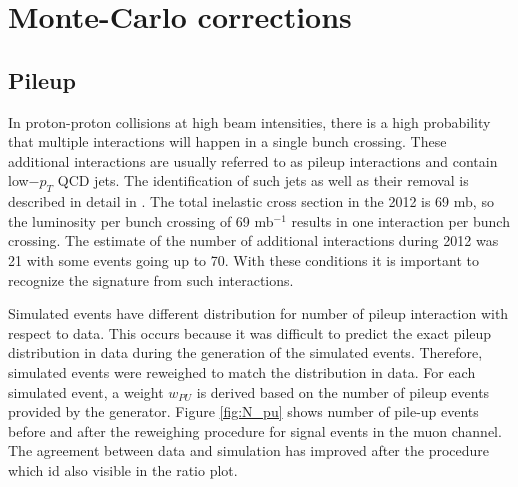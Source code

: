 

\section{Monte-Carlo corrections}
\label{sec:mcSF}

\subsection{Pileup}

In proton-proton collisions at high beam intensities, there is a high probability that multiple interactions will happen in a single bunch crossing. These additional interactions are usually referred to as pileup interactions and contain low$-p_T$ QCD jets. The identification of such jets as well as their removal is described in detail in \cite{CMS:2013wea}. The total inelastic cross section in the 2012 is 69 mb, so the luminosity per bunch crossing of 69 mb$^{-1}$ results in one interaction per bunch crossing. The estimate of the number of additional interactions during 2012 was 21 with some events going up to 70. With these conditions it is important to recognize the signature from such interactions.  
\par Simulated events have different distribution for number of pileup interaction with respect to data. This occurs because it was difficult to predict the exact pileup distribution in data during the generation of the simulated events. Therefore, simulated events were reweighed to match the distribution in data. For each simulated event, a weight $w_{PU}$ is derived based on the number of pileup events provided by the generator. Figure \ref{fig:N_pu} shows number of pile-up events before and after the reweighing procedure for signal events in the muon channel. The agreement between data and simulation has improved after the procedure which id also visible in the ratio plot. 

